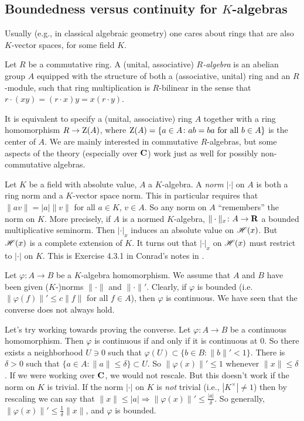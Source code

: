 \subsection{Boundedness versus continuity for \texorpdfstring{$K$}{K}-algebras}

Usually (e.g., in classical algebraic geometry) one cares about rings that are 
also $K$-vector spaces, for some field $K$. 

\begin{definition}
Let $R$ be a commutative ring. A (unital, associative) \emph{$R$-algebra} is an 
abelian group $A$ equipped with the structure of both a (associative, unital) 
ring and an $R$-module, such that ring multiplication is $R$-bilinear in the 
sense that $r\cdot(x y) = (r\cdot x) y = x(r\cdot y)$. 
\end{definition}

It is equivalent to specify a (unital, associative) ring $A$ together with a 
ring homomorphism $R\to \operatorname{Z}(A)$, where 
$\operatorname{Z}(A)=\{a\in A\colon a b=ba\text{ for all }b\in A\}$ is the center of 
$A$. We are mainly interested in commutative $R$-algebras, but some aspects of 
the theory (especially over $\mathbf{C}$) work just as well for possibly 
non-commutative algebras. 

Let $K$ be a field with absolute value, $A$ a $K$-algebra. A \emph{norm} 
$|\cdot|$ on $A$ is both a ring norm and a $K$-vector space norm. This in 
particular requires that $\|a v\| = |a| \| v\|$ for all $a\in K$, $v\in A$. 
So any norm on $A$ ``remembers'' the norm on $K$. More precisely, if $A$ is a 
normed $K$-algebra, $\|\cdot\|_x\colon A\to \mathbf{R}$ a bounded multiplicative 
seminorm. Then $|\cdot|_x$ induces an absolute value on $\mathscr{H}(x)$. But $\mathscr{H}(x)$ 
is a complete extension of $K$. It turns out that $|\cdot|_x$ on $\mathscr{H}(x)$ 
must restrict to $|\cdot|$ on $K$. This is Exercise 4.3.1 in Conrad's notes in 
\cite{aws-2008}.

Let $\varphi\colon A\to B$ be a $K$-algebra homomorphism. We assume that 
$A$ and $B$ have been given ($K$-)norms $\|\cdot\|$ and $\|\cdot\|'$. Clearly, 
if $\varphi$ is bounded (i.e.~$\|\varphi(f)\|' \leqslant c\|f\|$ for all 
$f\in A$), then $\varphi$ is continuous. We have seen that the converse does 
not always hold. 

Let's try working towards proving the converse. Let $\varphi\colon A\to B$ be a 
continuous homomorphism. Then $\varphi$ is continuous if and only if it is 
continuous at $0$. So there exists a neighborhood $U\ni 0$ such that 
$\varphi(U)\subset \{b\in B\colon \|b\|'<1\}$. There is $\delta>0$ such that 
$\{a\in A\colon \|a\|\leqslant \delta\}\subset U$. So 
$\|\varphi(x)\|'\leqslant 1$ whenever $\|x\|\leqslant \delta$. If we were 
working over $\mathbf{C}$, we would not rescale. But this doesn't work if the norm on 
$K$ is trivial. If the norm $|\cdot|$ on $K$ is \emph{not} trivial (i.e., 
$|K^\times|\ne 1$) then by rescaling we can say that 
$\|x\|\leqslant |a|\Rightarrow \|\varphi(x)\|' \leqslant \frac{|a|}{\delta}$. 
So generally, $\|\varphi(x)\|' \leqslant \frac{1}{\delta}\|x\|$, and 
$\varphi$ is bounded. 

